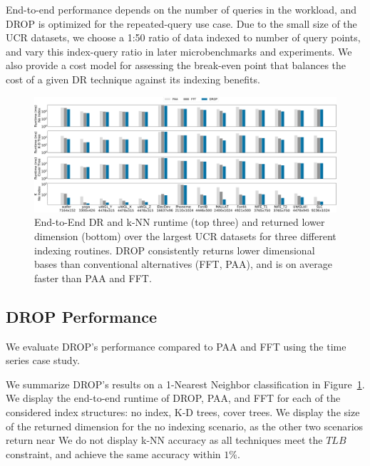 End-to-end performance depends on the number of queries in the workload, and DROP is optimized for the repeated-query use case. 
Due to the small size of the UCR datasets, we choose a 1:50 ratio of data indexed to number of query points, and vary this index-query ratio in later microbenchmarks and experiments. 
We also provide a cost model for assessing the break-even point that balances the cost of a given DR technique against its indexing benefits.


\begin{figure}[t!]
\includegraphics[width=\linewidth]{figs/KNNraw-revision.pdf}
\caption[]{End-to-End DR and k-NN runtime (top three) and returned lower dimension (bottom) over the largest UCR datasets for three different indexing routines. DROP consistently returns lower dimensional bases than conventional alternatives (FFT, PAA), and is on average faster than PAA and FFT.}
\label{fig:knnAll}
\end{figure}


\subsection{DROP Performance}
\label{subsec:runtime}


We evaluate DROP's performance compared to PAA and FFT using the time series case study. 

 We summarize DROP's results on a 1-Nearest Neighbor classification in Figure~\ref{fig:knnAll}.
We display the end-to-end runtime of DROP, PAA, and FFT for each of the considered index structures: no index, K-D trees, cover trees. 
We display the size of the returned dimension for the no indexing scenario, as the other two scenarios return near 
We do not display k-NN accuracy as all techniques meet the $TLB$ constraint, and achieve the same accuracy within $1\%$.

